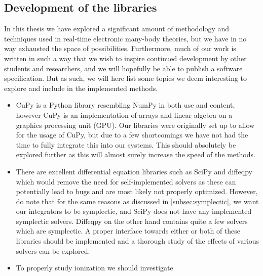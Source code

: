         \subsection{Development of the libraries}
            In this thesis we have explored a significant amount of methodology
            and techniques used in real-time electronic many-body theories, but
            we have in no way exhausted the space of possibilities.
            Furthermore, much of our work is written in such a way that we wish
            to inspire continued development by other students and researchers,
            and we will hopefully be able to publish a software specification.
            But as such, we will here list some topics we deem interesting to
            explore and include in the implemented methods.
            \begin{itemize}
                \item CuPy \cite{cupy} is a Python library resembling NumPy
                    \cite{numpy} in both use and content, however CuPy is an
                    implementation of arrays and linear algebra on a graphics
                    processing unit (GPU).
                    Our libraries were originally set up to allow for the usage
                    of CuPy, but due to a few shortcomings we have not had the
                    time to fully integrate this into our systems.
                    This should absolutely be explored
                    further as this will almost surely increase the speed of the
                    methods.
                \item There are excellent differential equation libraries
                    such as SciPy \cite{scipy} and diffeqpy \cite{julia-diff}
                    which would remove the need for self-implemented solvers as
                    these can potentially lead to bugs and are most likely not
                    properly optimized.
                    However, do note that for the same reasons as discussed in
                    \autoref{subsec:symplectic}, we want our integrators to be
                    symplectic, and SciPy does not have any implemented
                    symplectic solvers.
                    Diffeqpy on the other hand contains quite a few solvers
                    which are symplectic.
                    A proper interface towards either or both of these libraries
                    should be implemented and a thorough study of the effects of
                    various solvers can be explored.
                \item To properly study ionization we should investigate

\end{itemize}
